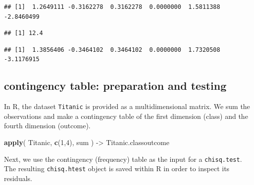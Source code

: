 \documentclass[
]{book}
\newenvironment{Shaded}{\begin{snugshade}}{\end{snugshade}}
\newcommand{\CommentTok}[1]{\textcolor[rgb]{0.56,0.35,0.01}{\textit{#1}}}
\newcommand{\DecValTok}[1]{\textcolor[rgb]{0.00,0.00,0.81}{#1}}
\newcommand{\FunctionTok}[1]{\textcolor[rgb]{0.13,0.29,0.53}{\textbf{#1}}}
\newcommand{\NormalTok}[1]{#1}
\newcommand{\OtherTok}[1]{\textcolor[rgb]{0.56,0.35,0.01}{#1}}
\newcommand{\SpecialCharTok}[1]{\textcolor[rgb]{0.81,0.36,0.00}{\textbf{#1}}}
\begin{document}
\begin{verbatim}
## [1]  1.2649111 -0.3162278  0.3162278  0.0000000  1.5811388 -2.8460499
\end{verbatim}

\begin{Shaded}
\end{Shaded}

\begin{verbatim}
## [1] 12.4
\end{verbatim}

\begin{Shaded}
\end{Shaded}

\begin{verbatim}
## [1]  1.3856406 -0.3464102  0.3464102  0.0000000  1.7320508 -3.1176915
\end{verbatim}

\subsection{contingency table: preparation and testing}\label{contingency-table-preparation-and-testing}

In R, the dataset \texttt{Titanic} is provided as a multidimensional matrix. We sum
the observations and make a contingency table of the first dimension (class) and
the fourth dimension (outcome).

\begin{Shaded}
\begin{Highlighting}[]
\FunctionTok{apply}\NormalTok{( Titanic, }\FunctionTok{c}\NormalTok{(}\DecValTok{1}\NormalTok{,}\DecValTok{4}\NormalTok{), sum ) }\OtherTok{{-}\textgreater{}}\NormalTok{ Titanic.classoutcome}
\end{Highlighting}
\end{Shaded}

Next, we use the contingency (frequency) table as the input for a \texttt{chisq.test}.
The resulting \texttt{chisq.htest} object is saved within R in order to inspect its residuals.
\end{document}
